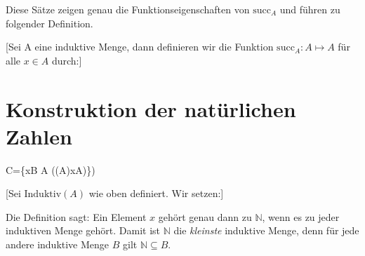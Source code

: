 \documentclass[main.tex]{subfiles}
\begin{document}
\begin{remark}
Diese Sätze zeigen genau die Funktionseigenschaften von \(\mathrm{succ}_A\)  und führen zu folgender Definition.
\end{remark}

[Sei A eine induktive Menge, dann definieren wir die Funktion \(\mathrm{succ}_A:A\mapsto A\)  für alle \(x\in A\) durch:]

\section{Konstruktion der natürlichen Zahlen}

\begin{tabproofwide}
    {}

    {}
  \proofstepwide{}{}%
    {C=\{x\in B \mid \forall A ((A)\rightarrow x\in A)\})}%
    {}
\end{tabproofwide}


[Sei \(\mathrm{Induktiv}(A)\) wie oben definiert.  Wir setzen:]

\begin{remark}
  Die Definition sagt: Ein Element \(x\) gehört genau dann zu \(\mathbb{N}\), wenn es zu jeder induktiven Menge gehört.  Damit ist \(\mathbb{N}\) die \emph{kleinste} induktive Menge, denn für jede andere induktive Menge \(B\) gilt \(\mathbb{N} \subseteq B\).
\end{remark}

\begin{tabproofwide}
\end{tabproofwide}
\end{document}
